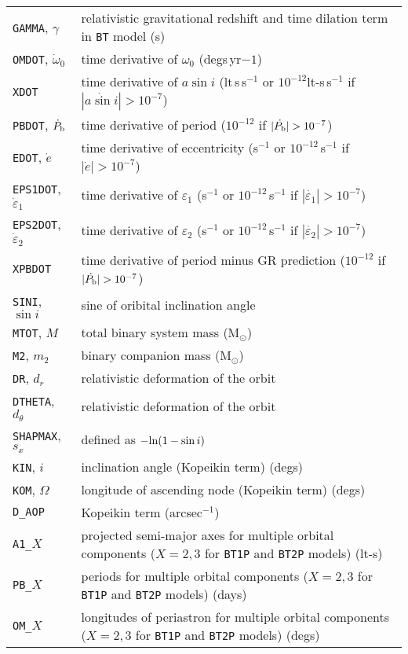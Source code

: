 \begin{longtable}{l|l}
{\tt GAMMA}, $\gamma$ & relativistic gravitational redshift and time dilation term in {\tt BT} model (s) \\
{\tt OMDOT}, $\dot{\omega}_0$ & time derivative of $\omega_0$ (degs\,yr${-1}$) \\
{\tt XDOT} & time derivative of $a\sin{i}$ (lt\,s\,s$^{-1}$ or $10^{-12}$lt-s\,s$^{-1}$ if $|\dot{a\sin{i}}| > 10^{-7}$)  \\
{\tt PBDOT}, $\dot{P}_{\rm b}$ & time derivative of period ($10^{-12}$ if $|\dot{P_{\rm b}}| > 10^{-7}$) \\
{\tt EDOT}, $\dot{e}$ & time derivative of eccentricity (s$^{-1}$ or $10^{-12}$\,s$^{-1}$ if $|\dot{e}| > 10^{-7}$) \\
{\tt EPS1DOT}, $\dot{\varepsilon}_1$ & time derivative of $\varepsilon_1$ (s$^{-1}$ or $10^{-12}$\,s$^{-1}$ if $|\dot{\varepsilon_1}| > 10^{-7}$) \\
{\tt EPS2DOT}, $\dot{\varepsilon}_2$ & time derivative of $\varepsilon_2$ (s$^{-1}$ or $10^{-12}$\,s$^{-1}$ if $|\dot{\varepsilon_2}| > 10^{-7}$) \\
{\tt XPBDOT} & time derivative of period minus GR prediction ($10^{-12}$ if $|\dot{P_{\rm b}}| > 10^{-7}$) \\
{\tt SINI}, $\sin{i}$ & sine of oribital inclination angle \\
{\tt MTOT}, $M$ & total binary system mass (M$_{\odot}$) \\
{\tt M2}, $m_2$ & binary companion mass (M$_{\odot}$) \\
{\tt DR}, $d_r$ & relativistic deformation of the orbit \\
{\tt DTHETA}, $d_{\theta}$ & relativistic deformation of the orbit \\
{\tt SHAPMAX}, $s_x$ & defined as $-{\rm ln}(1-\sin{i})$ \\
{\tt KIN}, $i$ & inclination angle (Kopeikin term) (degs) \\
{\tt KOM}, $\Omega$ & longitude of ascending node (Kopeikin term) (degs) \\
{\tt D\_AOP} & Kopeikin term (arcsec$^{-1}$) \citep[see e.g.\ Section~2.7.1 of][]{2006MNRAS.372.1549E} \\
{\tt A1\_}$X$ & projected semi-major axes for multiple orbital components ($X=2,3$ for {\tt BT1P} and {\tt BT2P} models) (lt-s) \\
{\tt PB\_}$X$ & periods for multiple orbital components ($X=2,3$ for {\tt BT1P} and {\tt BT2P} models) (days) \\
{\tt OM\_}$X$ & longitudes of periastron for multiple orbital components ($X=2,3$ for {\tt BT1P} and {\tt BT2P} models) (degs) \\

\end{longtable}

